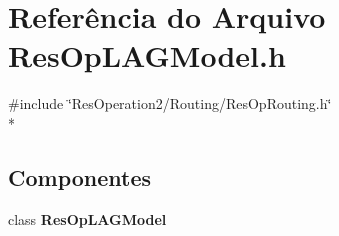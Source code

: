 \section{Referência do Arquivo Res\+Op\+L\+A\+G\+Model.\+h}
\label{_res_op_l_a_g_model_8h}
{\ttfamily \#include \char`\"{}Res\+Operation2/\+Routing/\+Res\+Op\+Routing.\+h\char`\"{}}\\*
\subsection*{Componentes}
\begin{DoxyCompactItemize}
\item 
class {\bf Res\+Op\+L\+A\+G\+Model}
\end{DoxyCompactItemize}
